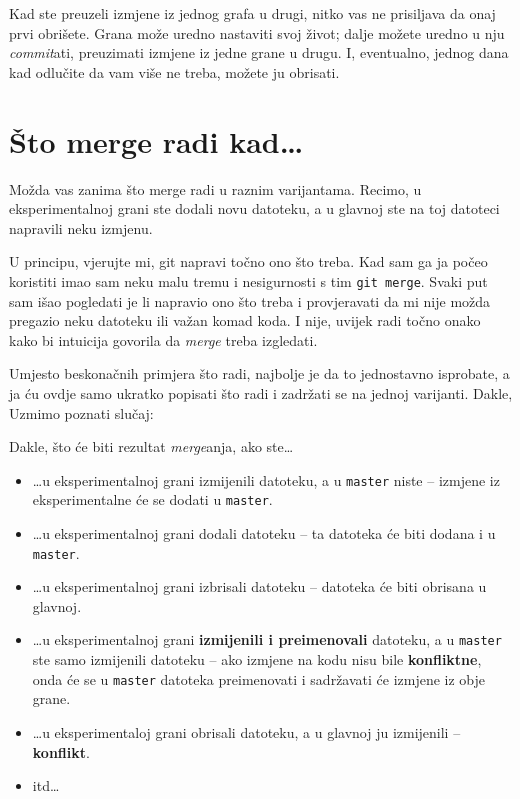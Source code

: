 

Kad ste preuzeli izmjene iz jednog grafa u drugi, nitko vas ne prisiljava da onaj prvi obrišete. 
Grana može uredno nastaviti svoj život; dalje možete uredno u nju \emph{commit}ati, preuzimati izmjene iz jedne grane u drugu.
I, eventualno, jednog dana kad odlučite da vam više ne treba, možete ju obrisati.





\section*{Što merge radi kad\dots}

Možda vas zanima što merge radi u raznim varijantama.
Recimo, u eksperimentalnoj grani ste dodali novu datoteku, a u glavnoj ste na toj datoteci napravili neku izmjenu.

U principu, vjerujte mi, git napravi točno ono što treba. 
Kad sam ga ja počeo koristiti imao sam neku malu tremu i nesigurnosti s tim \verb+git merge+.
Svaki put sam išao pogledati je li napravio ono što treba i provjeravati da mi nije možda pregazio neku datoteku ili važan komad koda.
I nije, uvijek radi točno onako kako bi intuicija govorila da \emph{merge} treba izgledati.

Umjesto beskonačnih primjera što radi, najbolje je da to jednostavno isprobate, a ja ću ovdje samo ukratko popisati što radi i zadržati se na jednoj varijanti. Dakle, 
Uzmimo poznati slučaj:



Dakle, što će biti rezultat \emph{merge}anja, ako ste\dots

\begin{itemize}
	\item \dots{}u eksperimentalnoj grani izmijenili datoteku, a u \verb+master+ niste -- izmjene iz eksperimentalne će se dodati u \verb+master+.
	\item \dots{}u eksperimentalnoj grani dodali datoteku -- ta datoteka će biti dodana i u \verb+master+.
	\item \dots{}u eksperimentalnoj grani izbrisali datoteku -- datoteka će biti obrisana u glavnoj.
	\item \dots{}u eksperimentalnoj grani \textbf{izmijenili i preimenovali} datoteku, a u \verb+master+ ste samo izmijenili datoteku -- ako izmjene na kodu nisu bile \textbf{konfliktne}, onda će se u \verb+master+ datoteka preimenovati i sadržavati će izmjene iz obje grane.
	\item \dots{}u eksperimentaloj grani obrisali datoteku, a u glavnoj ju izmijenili -- \textbf{konflikt}.
	\item itd\dots
\end{itemize}

